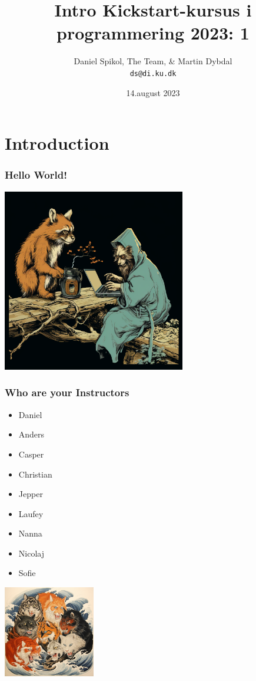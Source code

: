 \documentclass[10pt]{beamer}
\title[Kickstart-kursus] %
  {Intro Kickstart-kursus i programmering 2023: 1} %
\author{\footnotesize{Daniel Spikol, The Team, \& Martin Dybdal}\\
          \footnotesize{\texttt{ds@di.ku.dk}}}
\institute {
DIKU \\ Københavns Universitet
}
\date[14. august 2023]{14.august 2023}
\begin{document}
\begin{frame}[plain]
\titlepage
\end{frame}

\section{Introduction}
\begin{frame}
   \frametitle{Hello World!}
   	 \includegraphics[height=8cm]{images/week33_image}
\end{frame}


\begin{frame}
 \frametitle{Who are your Instructors}
   \begin{itemize}
   \item Daniel
   \item Anders
   \item Casper
   \item Christian
   \item Jepper
   \item Laufey
   \item Nanna
   \item Nicolaj
   \item Sofie
\end{itemize}
     \hspace{8 em}
      \includegraphics[height=4cm]{images/the_team}

\end{frame}
\end{document}
